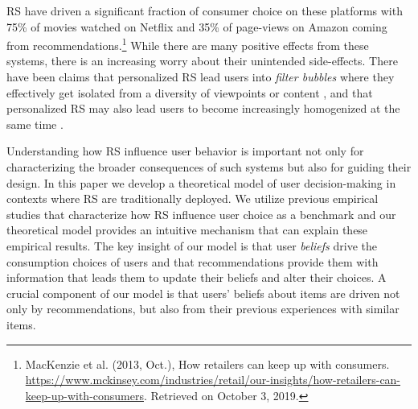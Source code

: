 \documentclass{article}
\begin{document}
RS have driven a significant fraction of consumer choice on these platforms with 75\% of movies watched on Netflix and 35\% of page-views on Amazon coming from recommendations.\footnote{MacKenzie et al. (2013, Oct.),  How retailers can keep up with consumers. \url{https://www.mckinsey.com/industries/retail/our-insights/how-retailers-can-keep-up-with-consumers}. Retrieved on October 3, 2019.} While there are many positive effects from these systems, there is an increasing worry about their unintended side-effects. There have been claims that personalized RS lead users into \textit{filter bubbles} where they effectively get isolated from a diversity of viewpoints or content \cite{pariser2011filter}, and that personalized RS may also lead users to become increasingly homogenized at the same time \cite{chaney2018algorithmic, hosanagar2013will}.
\par
Understanding how RS influence user behavior is important not only for characterizing the broader consequences of such systems but also for guiding their design. In this paper we develop a theoretical model of user decision-making in contexts where RS are traditionally deployed. We utilize previous empirical studies that characterize how RS influence user choice as a benchmark and our theoretical model provides an intuitive mechanism that can explain these empirical results. The key insight of our model is that user \textit{beliefs} drive the consumption choices of users and that recommendations provide them with information that leads them to update their beliefs and alter their choices. A crucial component of our model is that users' beliefs about items are driven not only by recommendations, but also from their previous experiences with similar items. 
\end{document}
